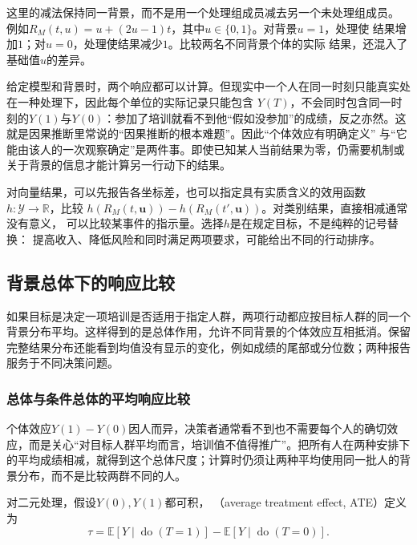 这里的减法保持同一背景，而不是用一个处理组成员减去另一个未处理组成员。
例如\(R_M(t,u)=u+(2u-1)t\)，其中\(u\in\{0,1\}\)。对背景\(u=1\)，处理使
结果增加\(1\)；对\(u=0\)，处理使结果减少\(1\)。比较两名不同背景个体的实际
结果，还混入了基础值\(u\)的差异。

给定模型和背景时，两个响应都可以计算。但现实中一个人在同一时刻只能真实处在一种处理下，因此每个单位的实际记录只能包含
\(Y(T)\)，不会同时包含同一时刻的\(Y(1)\)与\(Y(0)\)：参加了培训就看不到他“假如没参加”的成绩，反之亦然。这就是因果推断里常说的“因果推断的根本难题”。因此“个体效应有明确定义”
与“它能由该人的一次观察确定”是两件事。即使已知某人当前结果为零，仍需要机制或
关于背景的信息才能计算另一行动下的结果。

对向量结果，可以先报告各坐标差，也可以指定具有实质含义的效用函数
\(h:\mathcal Y\to\mathbb R\)，比较
\(h(R_M(t,\bm u))-h(R_M(t',\bm u))\)。对类别结果，直接相减通常没有意义，
可以比较某事件的指示量。选择\(h\)是在规定目标，不是纯粹的记号替换：
提高收入、降低风险和同时满足两项要求，可能给出不同的行动排序。

\subsection{背景总体下的响应比较}
\label{sec:causal-population-response}

如果目标是决定一项培训是否适用于指定人群，两项行动都应按目标人群的同一个背景分布平均。这样得到的是总体作用，允许不同背景的个体效应互相抵消。保留完整结果分布还能看到均值没有显示的变化，例如成绩的尾部或分位数；两种报告服务于不同决策问题。

\subsubsection{总体与条件总体的平均响应比较}
\label{sec:causal-average-response}

个体效应\(Y(1)-Y(0)\)因人而异，决策者通常看不到也不需要每个人的确切效应，而是关心“对目标人群平均而言，培训值不值得推广”。把所有人在两种安排下的平均成绩相减，就得到这个总体尺度；计算时仍须让两种平均使用同一批人的背景分布，而不是比较两群不同的人。
\begin{definition}[平均处理效应]
  \label{def:causal-average-treatment-effect}
  对二元处理，假设\(Y(0),Y(1)\)都可积，
  （average treatment effect, ATE）定义为
  \begin{equation}
    \tau
    =
    \mathbb E[Y\mid\operatorname{do}(T=1)]
    -
    \mathbb E[Y\mid\operatorname{do}(T=0)].
    \label{eq:causal-ate-interventional}
  \end{equation}
\end{definition}

